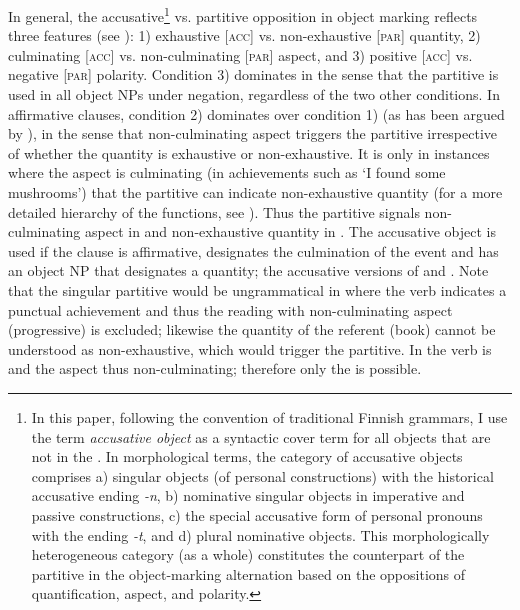 \documentclass[output=paper]{LSP/langsci}
\begin{document}
In general, the accusative\footnote{In this paper, following the convention of traditional Finnish  grammars, I use the term \textit{accusative object} as a syntactic cover term for all objects that are not in the . In morphological terms, the category of accusative objects comprises a) singular objects (of personal constructions) with the historical accusative ending \textit{-n}, b) nominative singular objects in imperative and passive constructions, c) the special accusative form of personal pronouns with the ending \textit{-t}, and d) plural nominative objects. This morphologically heterogeneous category (as a whole) constitutes the counterpart of the partitive in the object-marking alternation based on the oppositions of quantification, aspect, and polarity.} vs. partitive opposition in  object marking reflects three features (see \eg \citealt{Heinamaki1984Aspect,Heinamaki1994Aspect,Kiparsky1998Partitive,Huumo2010Nominal,Huumo2013incompleteness}): 
1) exhaustive [\textsc{acc}] vs. non-exhaustive [\textsc{par}] quantity, 
2) culminating [\textsc{acc}] vs. non-culmi\-nating [\textsc{par}] aspect, and 
3) positive [\textsc{acc}] vs. negative [\textsc{par}] polarity. Condition 3) dominates in the sense that the partitive is used in all object NPs under negation, regardless of the two other conditions. In affirmative clauses, condition 2) dominates over condition 1) (as has been argued \eg by \citealt{Vilkuna1996Suomen}), in the sense that non-culmi\-nating aspect triggers the partitive irrespective of whether the quantity is exhaustive or non-exhaustive. It is only in instances where the aspect is culminating (\eg in achievements such as ‘I found some mushrooms’) that the partitive can indicate non-exhaustive quantity (for a more detailed hierarchy of the functions, see \citealt{Huumo2013incompleteness}). Thus the partitive signals non-culminating aspect in  and non-exhaustive quantity in . The accusative object is used if the clause is affirmative, designates the culmination of the event and has an object NP that designates a  quantity; \cf the accusative versions of  and . Note that the singular partitive would be ungrammatical in  where the verb indicates a punctual achievement and thus the reading with non-culminating aspect (\ie progressive) is excluded; likewise the quantity of the referent (book) cannot be understood as non-exhaustive, which would trigger the partitive. In  the verb is  and the aspect thus non-culminating; therefore only the  is possible.
\end{document}

